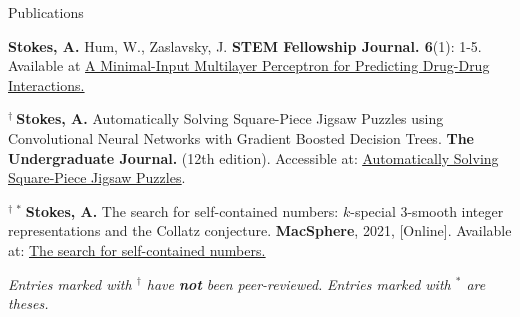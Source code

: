 \begin{rSection}{Publications}
\begin{enumerate}[label={[\arabic*]}]
  \item {\bf Stokes, A.} Hum, W., Zaslavsky, J. \textbf{STEM Fellowship Journal. 6}(1): 1-5. Available at \underline{\href{https://journal.stemfellowship.org/doi/10.17975/sfj-2020-006}{A Minimal-Input Multilayer Perceptron for Predicting Drug-Drug Interactions.}}
  
  \item $^\dagger \ ${\bf Stokes, A.} Automatically Solving Square-Piece Jigsaw Puzzles using Convolutional Neural Networks with Gradient Boosted Decision Trees. \textbf{The Undergraduate Journal.} (12th edition). Accessible at: \underline{\href{https://gua.soutron.net/Portal/Default/en-GB/RecordView/Index/61}{Automatically Solving Square-Piece Jigsaw Puzzles}}.
  \item $^{\dagger \ \ast \ }${\bf Stokes, A.} The search for self-contained numbers: $k$-special 3-smooth integer representations and the Collatz conjecture. \textbf{MacSphere}, 2021, [Online]. Available at: \underline{\href{https://macsphere.mcmaster.ca/handle/11375/27543}{The search for self-contained numbers.}}

\end{enumerate}

\smallskip
\emph{Entries marked with $^\dagger$ have \textbf{not} been peer-reviewed.} \hfill
\emph{Entries marked with $^\ast$ are theses.}

\end{rSection}